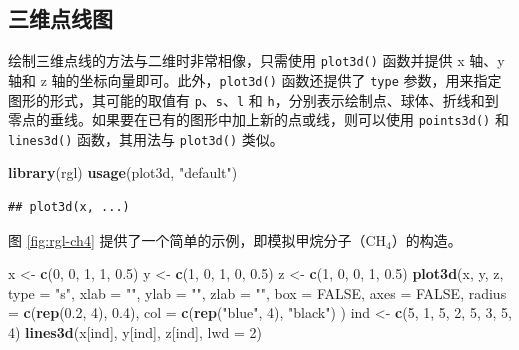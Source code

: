 \documentclass[
  b5paper,
  UTF8,twoside]{book}
\newenvironment{Shaded}{\begin{snugshade}}{\end{snugshade}}
\newcommand{\AttributeTok}[1]{\textcolor[rgb]{0.13,0.29,0.53}{#1}}
\newcommand{\ConstantTok}[1]{\textcolor[rgb]{0.56,0.35,0.01}{#1}}
\newcommand{\DecValTok}[1]{\textcolor[rgb]{0.00,0.00,0.81}{#1}}
\newcommand{\FloatTok}[1]{\textcolor[rgb]{0.00,0.00,0.81}{#1}}
\newcommand{\FunctionTok}[1]{\textcolor[rgb]{0.13,0.29,0.53}{\textbf{#1}}}
\newcommand{\NormalTok}[1]{#1}
\newcommand{\OtherTok}[1]{\textcolor[rgb]{0.56,0.35,0.01}{#1}}
\newcommand{\StringTok}[1]{\textcolor[rgb]{0.31,0.60,0.02}{#1}}
\begin{document}
\subsection{三维点线图}\label{ux4e09ux7ef4ux70b9ux7ebfux56fe}

绘制三维点线的方法与二维时非常相像，只需使用 \texttt{plot3d()} 函数并提供 x 轴、y 轴和 z 轴的坐标向量即可。此外，\texttt{plot3d()} 函数还提供了 \texttt{type} 参数，用来指定图形的形式，其可能的取值有 \texttt{p}、\texttt{s}、\texttt{l} 和 \texttt{h}，分别表示绘制点、球体、折线和到零点的垂线。如果要在已有的图形中加上新的点或线，则可以使用 \texttt{points3d()} 和 \texttt{lines3d()} 函数，其用法与 \texttt{plot3d()} 类似。

\begin{Shaded}
\begin{Highlighting}[]
\FunctionTok{library}\NormalTok{(rgl)}
\FunctionTok{usage}\NormalTok{(plot3d, }\StringTok{"default"}\NormalTok{)}
\end{Highlighting}
\end{Shaded}

\begin{verbatim}
## plot3d(x, ...)
\end{verbatim}

图 \ref{fig:rgl-ch4} 提供了一个简单的示例，即模拟甲烷分子（\(\mathrm{CH_{4}}\)）的构造。

\begin{Shaded}
\begin{Highlighting}[]
\NormalTok{x }\OtherTok{\textless{}{-}} \FunctionTok{c}\NormalTok{(}\DecValTok{0}\NormalTok{, }\DecValTok{0}\NormalTok{, }\DecValTok{1}\NormalTok{, }\DecValTok{1}\NormalTok{, }\FloatTok{0.5}\NormalTok{)}
\NormalTok{y }\OtherTok{\textless{}{-}} \FunctionTok{c}\NormalTok{(}\DecValTok{1}\NormalTok{, }\DecValTok{0}\NormalTok{, }\DecValTok{1}\NormalTok{, }\DecValTok{0}\NormalTok{, }\FloatTok{0.5}\NormalTok{)}
\NormalTok{z }\OtherTok{\textless{}{-}} \FunctionTok{c}\NormalTok{(}\DecValTok{1}\NormalTok{, }\DecValTok{0}\NormalTok{, }\DecValTok{0}\NormalTok{, }\DecValTok{1}\NormalTok{, }\FloatTok{0.5}\NormalTok{)}
\FunctionTok{plot3d}\NormalTok{(x, y, z,}
  \AttributeTok{type =} \StringTok{"s"}\NormalTok{, }\AttributeTok{xlab =} \StringTok{""}\NormalTok{, }\AttributeTok{ylab =} \StringTok{""}\NormalTok{, }\AttributeTok{zlab =} \StringTok{""}\NormalTok{,}
  \AttributeTok{box =} \ConstantTok{FALSE}\NormalTok{, }\AttributeTok{axes =} \ConstantTok{FALSE}\NormalTok{, }\AttributeTok{radius =} \FunctionTok{c}\NormalTok{(}\FunctionTok{rep}\NormalTok{(}\FloatTok{0.2}\NormalTok{, }\DecValTok{4}\NormalTok{), }\FloatTok{0.4}\NormalTok{),}
  \AttributeTok{col =} \FunctionTok{c}\NormalTok{(}\FunctionTok{rep}\NormalTok{(}\StringTok{"blue"}\NormalTok{, }\DecValTok{4}\NormalTok{), }\StringTok{"black"}\NormalTok{)}
\NormalTok{)}
\NormalTok{ind }\OtherTok{\textless{}{-}} \FunctionTok{c}\NormalTok{(}\DecValTok{5}\NormalTok{, }\DecValTok{1}\NormalTok{, }\DecValTok{5}\NormalTok{, }\DecValTok{2}\NormalTok{, }\DecValTok{5}\NormalTok{, }\DecValTok{3}\NormalTok{, }\DecValTok{5}\NormalTok{, }\DecValTok{4}\NormalTok{)}
\FunctionTok{lines3d}\NormalTok{(x[ind], y[ind], z[ind], }\AttributeTok{lwd =} \DecValTok{2}\NormalTok{)}
\end{Highlighting}
\end{Shaded}
\end{document}
